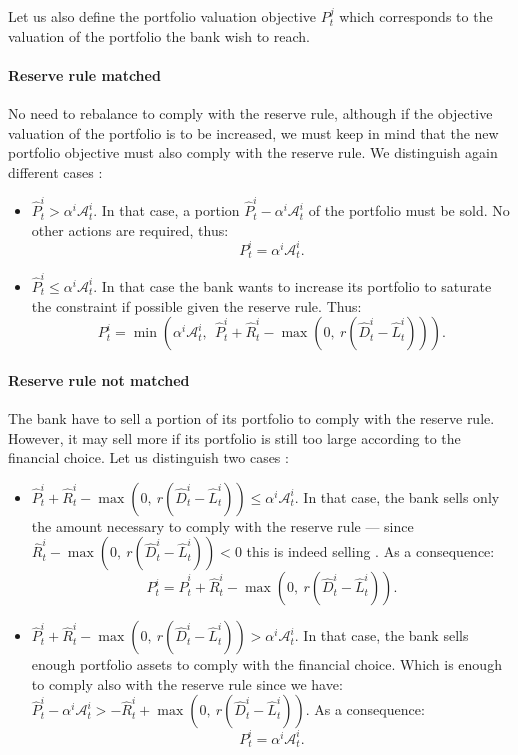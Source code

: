 \documentclass{article}
\newcommand{\wh}{\widehat}
\begin{document}
Let us also define the portfolio valuation objective $P_t^{j}$ which corresponds to the valuation of the portfolio the bank wish to reach.

\paragraph{Reserve rule matched}
No need to rebalance to comply with the reserve rule, although if the objective valuation of the portfolio is to be increased, we must keep in mind that the new portfolio objective must also comply with the reserve rule.
We distinguish again different cases : 
\begin{itemize}
    \item $\widehat{P}_t^i > \alpha^i \mathcal{A}_t^i$. In that case, a portion $\widehat{P}_t^i - \alpha^i \mathcal{A}_t^i$ of the portfolio must be sold. No other actions are required, thus:
     $$P_t^i = \alpha^i \mathcal{A}_t^i.$$
    \item $\widehat{P}_t^i \leq \alpha^i \mathcal{A}_t^i$. In that case the bank wants to increase its portfolio to saturate the constraint if possible given the reserve rule. Thus: $$P_t^{i} = \min \left(\alpha^i \mathcal{A}_t^i,~~\widehat{P}_t^i + \widehat{R}_t^i - \max(0,~r(\wh D_t^i - \wh L_t^i)) \right).$$
\end{itemize}

\paragraph{Reserve rule not matched}
The bank have to sell a portion of its portfolio to comply with the reserve rule. However, it may sell more if its portfolio is still too large according to the financial choice. Let us distinguish two cases :
\begin{itemize}
    \item $\widehat{P}_t^i + \widehat{R}_t^i - \max(0,~r(\wh D_t^i - \wh L_t^i)) \leq \alpha^i \mathcal{A}_t^i$. In that case, the bank sells only the amount necessary to comply with the reserve rule --- since $\widehat{R}_t^i - \max(0,~r(\wh D_t^i - \wh L_t^i)) < 0$ this is indeed selling . As a consequence: 
    $$ P_t^{i} = \widehat{P}_t^i + \widehat{R}_t^i - \max(0,~r(\wh D_t^i - \wh L_t^i)).$$
    \item $\widehat{P}_t^i + \widehat{R}_t^i - \max(0,~r(\wh D_t^i - \wh L_t^i)) > \alpha^i \mathcal{A}_t^i$. In that case, the bank sells enough portfolio assets to comply with the financial choice. Which is enough to comply also with the reserve rule since we have: $\widehat{P}_t^i - \alpha^i \mathcal{A}_t^i > - \widehat{R}_t^i + \max(0,~r(\wh D_t^i - \wh L_t^i)) $. As a consequence: 
    $$ P_t^i = \alpha^i \mathcal{A}_t^i.$$
    
\end{itemize}
\end{document}
